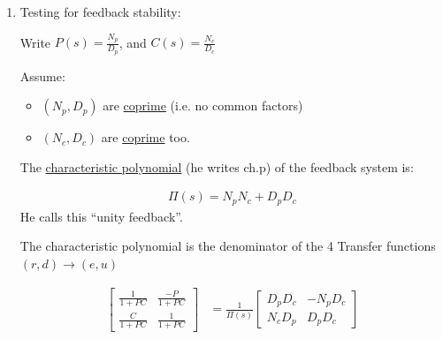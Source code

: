 \begin{enumerate}
            {\bf Example}:
            \begin{align*}
                P(s) &= \frac{1}{s^2 -1} \\
                C(s) &= \frac{s-1}{s+1}
            \end{align*}

            The 4 transfer functions are:
            \begin{align*}
                \begin{bmatrix}
                    \frac{(s+1)^2}{s^2 + 2s + 2} &
                    \frac{s+1}{(s+1)(s^2 + 2s + 2)} \\
                    \frac{(s+1)(s-1)}{s^2 + 2s + 2} &
                    \frac{(s+1)^2}{s^2 + 2s + 2}
                \end{bmatrix}
            \end{align*}

            Three of the transfer functions are BIBO stable, the one from $D$ to $E$ is {\uline not}. This is in spite of the fact that a bounded $r$ produces a bounded $y$. Notice that $C(s)$ cancels an unstable pole in $P(s)$.

            We'll see that this doesn't work.

        \item Testing for feedback stability:

            Write $P(s) = \frac{N_p}{D_p}$, and $C(s) = \frac{N_c}{D_c}$

            Assume:

            \begin{itemize}
                \item $(N_p, D_p)$ are \uline{coprime} (i.e. no common factors)
                \item $(N_c, D_c)$ are \uline{coprime} too.
            \end{itemize}

            The \uline{characteristic polynomial} (he writes ch.p) of the feedback system is:

            \begin{align*} \Pi(s) = N_p N_c + D_p D_c\end{align*}
            He calls this ``unity feedback''.

            The characteristic polynomial is the denominator of the 4 Transfer functions $(r,d) \to (e, u)$

            \begin{align*}
                \begin{bmatrix} \frac{1}{1+PC} & \frac{-P}{1+PC} \\ \frac{C}{1+PC} & \frac{1}{1+PC}  \end{bmatrix} &=
                \frac{1}{\Pi(s)} \begin{bmatrix}
                    D_p D_c & -N_p D_c \\
                    N_c D_p & D_p D_c
                \end{bmatrix}
            \end{align*}


\end{enumerate}
